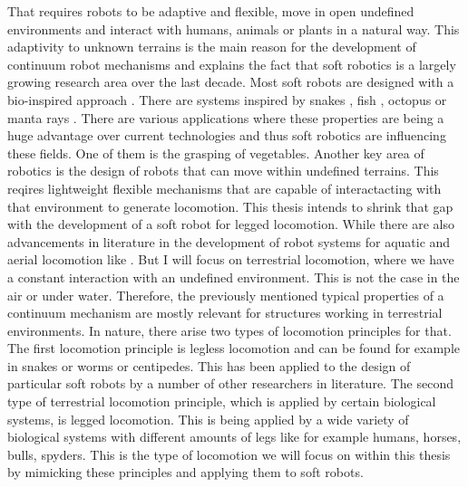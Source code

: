 That requires robots to be adaptive and flexible, move in open undefined environments and interact with humans, animals or plants in a natural way. This adaptivity to unknown terrains
is the main reason for the development of continuum robot mechanisms and explains the fact that soft robotics is a largely growing research area over the last decade.
%
Most soft robots are designed with a bio-inspired approach \cite{Kim2013,Trivedi2008}. There are systems inspired by snakes \cite{Onal2013, Qi2020, Branyan2017_conf},
 fish \cite{Hou2019_conf,Hu2020,Marchese2014}, octopus \cite{OBrien2001_conf,Neppalli2007_conf} or manta rays \cite{Suzumori2007_conf,Cai2009_conf}.
%
There are various applications where these properties are being a huge advantage over current technologies and thus soft robotics are influencing these fields. 
One of them is the grasping of vegetables. 
%
Another key area of robotics is the design of robots that can move within undefined terrains. This reqires lightweight flexible mechanisms that are capable of interactacting
 with that environment to generate locomotion. This thesis intends to shrink that gap with the development of a soft robot for legged locomotion. While there are also advancements
 in literature in the development of robot systems for aquatic and aerial locomotion like . But I will focus on terrestrial locomotion, where we have a constant interaction with an 
 undefined environment. This is not the case in the air or under water. Therefore, the previously mentioned typical properties of a continuum mechanism are mostly relevant for
 structures working in terrestrial environments. In nature, there arise two types of locomotion principles for that. The first locomotion principle is legless locomotion and can 
 be found for example in snakes or worms or centipedes. This has been applied to the design of particular soft robots by a number of other researchers in literature. 
 The second type of terrestrial locomotion principle, which is applied by certain biological systems, is legged locomotion. This is being applied by a wide variety of biological
 systems with different amounts of legs like for example humans, horses, bulls, spyders. This is the type of locomotion we will focus on within this thesis by mimicking these principles
 and applying them to soft robots.
%



%
%
%
